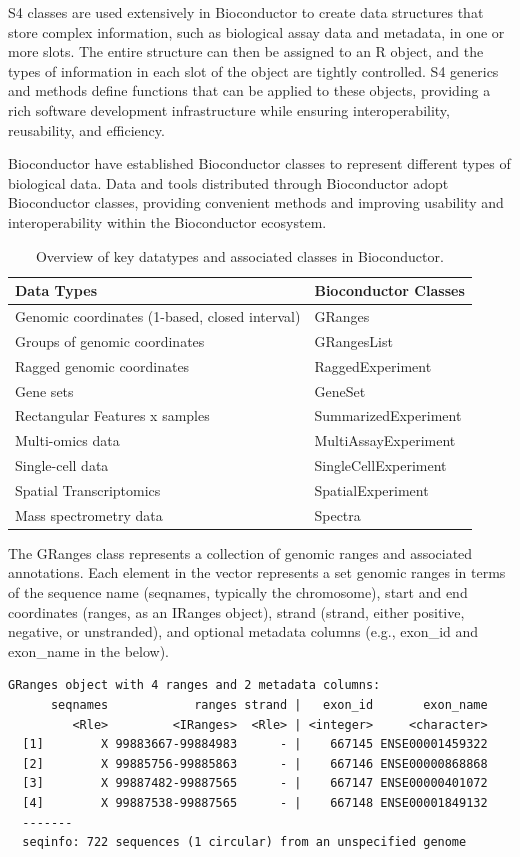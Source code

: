 \documentclass[graybox]{svmult}
\begin{document}
S4 classes are used extensively in Bioconductor to create data structures that store complex information, such as biological assay data and metadata, in one or more slots. The entire structure can then be assigned to an R object, and the types of information in each slot of the object are tightly controlled. S4 generics and methods define functions that can be applied to these objects, providing a rich software development infrastructure while ensuring interoperability, reusability, and efficiency.

Bioconductor have established Bioconductor classes to represent different types of biological data. Data and tools distributed through Bioconductor adopt Bioconductor classes, providing convenient methods and improving usability and interoperability within the Bioconductor ecosystem.

\begin{table}
\caption{Overview of key datatypes and associated classes in Bioconductor.}
\begin{tabular}[t]{ll}
\toprule
Data Types & Bioconductor Classes\\
\midrule
Genomic coordinates (1-based, closed interval) & GRanges\\
Groups of genomic coordinates & GRangesList\\
Ragged genomic coordinates & RaggedExperiment\\
Gene sets & GeneSet\\
Rectangular Features x samples & SummarizedExperiment\\
\addlinespace
Multi-omics data & MultiAssayExperiment\\
Single-cell data & SingleCellExperiment\\
Spatial Transcriptomics & SpatialExperiment\\
Mass spectrometry data & Spectra\\
\bottomrule
\end{tabular}
\end{table}

The GRanges class represents a collection of genomic ranges and associated annotations. Each element in the vector represents a set genomic ranges in terms of the sequence name (seqnames, typically the chromosome), start and end coordinates (ranges, as an IRanges object), strand (strand, either positive, negative, or unstranded), and optional metadata columns (e.g., exon\_id and exon\_name in the below).

\begin{verbatim}
GRanges object with 4 ranges and 2 metadata columns:
      seqnames            ranges strand |   exon_id       exon_name
         <Rle>         <IRanges>  <Rle> | <integer>     <character>
  [1]        X 99883667-99884983      - |    667145 ENSE00001459322
  [2]        X 99885756-99885863      - |    667146 ENSE00000868868
  [3]        X 99887482-99887565      - |    667147 ENSE00000401072
  [4]        X 99887538-99887565      - |    667148 ENSE00001849132
  -------
  seqinfo: 722 sequences (1 circular) from an unspecified genome
\end{verbatim}
\end{document}
